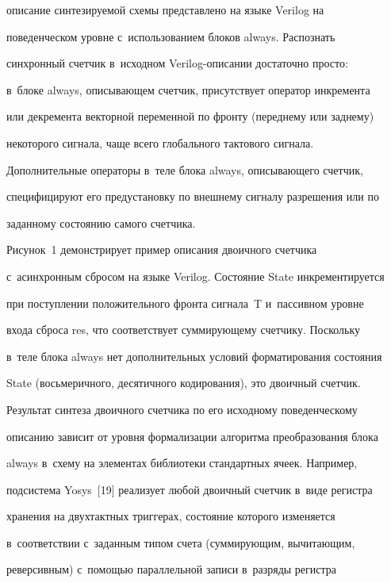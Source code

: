 описание син\-те\-зи\-ру\-емой схемы пред\-став\-ле\-но на языке Verilog на 

поведенческом уровне с~использованием блоков always. Распознать 

синхронный счетчик в~исходном Verilog-опи\-са\-нии достаточно просто: 

в~блоке always, опи\-сы\-ва\-ющем счетчик, присутствует оператор инкремента 

или декремента векторной переменной по фронту (переднему или зад\-не\-му) 

некоторого сигнала, чаще всего глобального тактового сигнала. 

Дополнительные операторы в~теле блока always, описывающего счет\-чик, 

специфицируют его предуста\-нов\-ку по внеш\-не\-му сигналу разрешения или по 

заданному со\-сто\-янию самого счет\-чика. 

  

  Рисунок~1 демонстрирует пример описания двоичного счетчика 

с~асинхронным сбросом на языке Verilog. Состояние State инкрементируется 

при по\-ступ\-ле\-нии положительного фронта сигнала~T и~пассивном уровне 

входа сброса res, что соответствует сум\-ми\-ру\-юще\-му счетчику. Поскольку 

в~теле блока always нет дополнительных условий форматирования со\-сто\-яния 

State (восьмеричного, десятичного кодирования), это двоичный счетчик.

  

  

  Результат синтеза двоичного счетчика по его исходному поведенческому 

описанию зависит от уровня формализации алгоритма преобразования блока 

always в~схему на элементах биб\-лио\-те\-ки стандартных ячеек. Например, 

под\-сис\-те\-ма Yosys~[19] реализует любой двоичный счетчик в~виде ре\-гист\-ра 

хранения на двухтактных триггерах, со\-сто\-яние которого изменяется 

в~соответствии с~заданным типом счета (сум\-ми\-ру\-ющим, вы\-чи\-та\-ющим, 

реверсивным) с~по\-мощью параллельной записи в~разряды ре\-гист\-ра 

